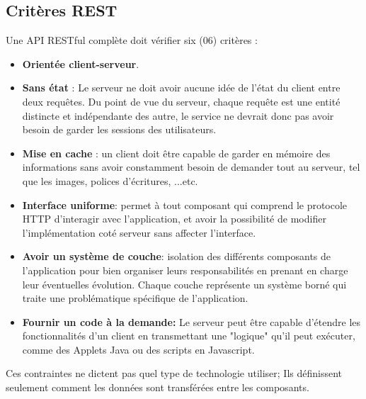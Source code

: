 \subsection{Critères REST}
Une API RESTful complète doit vérifier six (06) critères :
\begin{itemize}
	\item \textbf{Orientée client-serveur}.
	      
	\item \textbf{Sans état} : Le serveur ne doit avoir aucune idée de l'état du client entre deux requêtes. Du point de vue du serveur, chaque requête est une entité distincte et indépendante des autre,  le service ne devrait donc pas avoir besoin de garder les sessions des utilisateurs.
	      
	\item \textbf{Mise en cache} : un client doit être capable de garder en mémoire des informations sans avoir constamment besoin de demander tout au serveur, tel que les images, polices d'écritures, ...etc.
	      
	\item \textbf{Interface uniforme}: permet à tout composant qui comprend le protocole HTTP d'interagir avec l'application, et avoir la possibilité de modifier l'implémentation coté serveur sans affecter l'interface.
	      
	\item \textbf{Avoir un système de couche}: isolation des différents composants de l'application pour bien organiser leurs responsabilités en prenant en charge leur éventuelles évolution. Chaque couche représente un système borné qui traite une problématique spécifique de l'application.
	      
	\item \textbf{Fournir un code à la demande: }  Le serveur peut être capable d'étendre les fonctionnalités d'un client en transmettant une "logique" qu'il peut exécuter, comme des Applets Java ou des scripts en Javascript.
	      
\end{itemize}
Ces contraintes ne dictent pas quel type de technologie utiliser; Ils définissent seulement comment les données sont transférées entre les composants.

